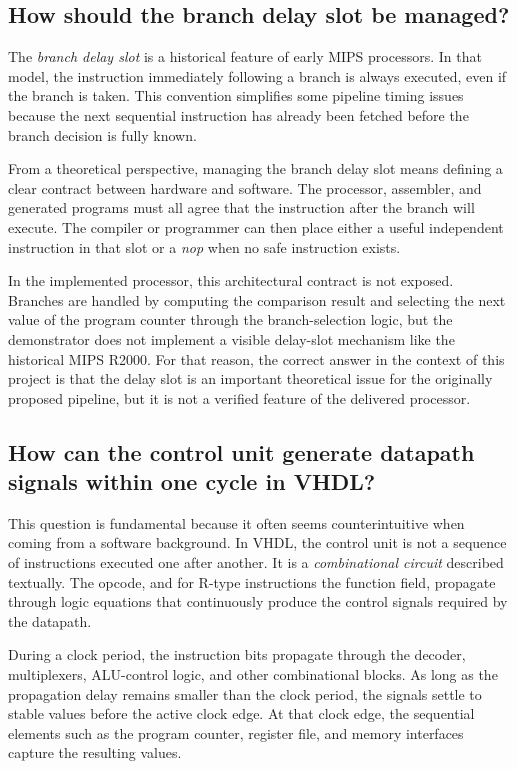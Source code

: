 \documentclass[a4paper,11pt]{scrartcl}
\begin{document}
\subsection{How should the branch delay slot be managed?}
\label{sec:org97ff2fc}

The \emph{branch delay slot} is a historical feature of early MIPS processors. In that model, the instruction immediately following a branch is always executed, even if the branch is taken. This convention simplifies some pipeline timing issues because the next sequential instruction has already been fetched before the branch decision is fully known.

From a theoretical perspective, managing the branch delay slot means defining a clear contract between hardware and software. The processor, assembler, and generated programs must all agree that the instruction after the branch will execute. The compiler or programmer can then place either a useful independent instruction in that slot or a \emph{nop} when no safe instruction exists.

In the implemented processor, this architectural contract is not exposed. Branches are handled by computing the comparison result and selecting the next value of the program counter through the branch-selection logic, but the demonstrator does not implement a visible delay-slot mechanism like the historical MIPS R2000. For that reason, the correct answer in the context of this project is that the delay slot is an important theoretical issue for the originally proposed pipeline, but it is not a verified feature of the delivered processor.
\subsection{How can the control unit generate datapath signals within one cycle in VHDL?}
\label{sec:orga998953}

This question is fundamental because it often seems counterintuitive when coming from a software background. In VHDL, the control unit is not a sequence of instructions executed one after another. It is a \emph{combinational circuit} described textually. The opcode, and for R-type instructions the function field, propagate through logic equations that continuously produce the control signals required by the datapath.

During a clock period, the instruction bits propagate through the decoder, multiplexers, ALU-control logic, and other combinational blocks. As long as the propagation delay remains smaller than the clock period, the signals settle to stable values before the active clock edge. At that clock edge, the sequential elements such as the program counter, register file, and memory interfaces capture the resulting values.
\end{document}
